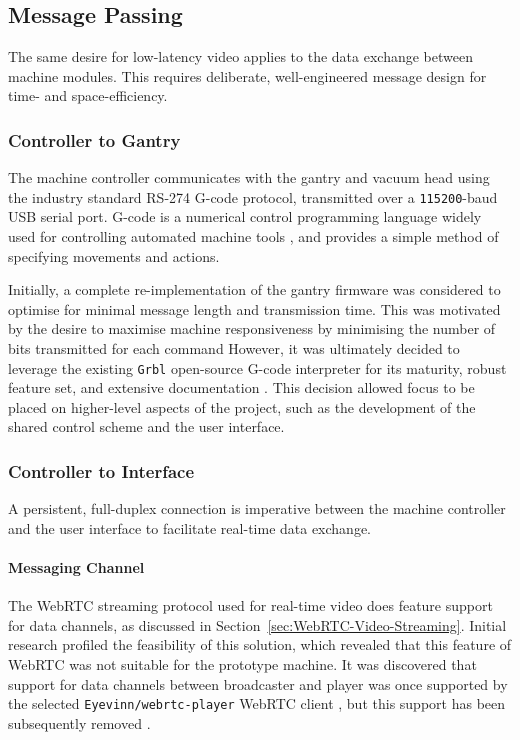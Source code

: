 \documentclass[12pt,british,UKenglish]{article}
\begin{document}

\subsection{Message Passing}

The same desire for low-latency video applies to the data exchange between machine modules.
This requires deliberate, well-engineered message design for time- and space-efficiency.

\subsubsection{Controller to Gantry}\label{sec:Controller-Interface-Messages}

The machine controller communicates with the gantry and vacuum head using the industry standard RS-274 G-code protocol, transmitted over a \texttt{115200}-baud USB serial port.
G-code is a numerical control programming language widely used for controlling automated machine tools \cite{02683768}, and provides a simple method of specifying movements and actions.

Initially, a complete re-implementation of the gantry firmware was considered to optimise for minimal message length and transmission time.
This was motivated by the desire to maximise machine responsiveness by minimising the number of bits transmitted for each command
However, it was ultimately decided to leverage the existing \texttt{Grbl} open-source G-code interpreter for its maturity, robust feature set, and extensive documentation \cite{grbl}.
This decision allowed focus to be placed on higher-level aspects of the project, such as the development of the shared control scheme and the user interface.


\subsubsection{Controller to Interface}\label{sec:Controller-Interface}

A persistent, full-duplex connection is imperative between the machine controller and the user interface to facilitate real-time data exchange.

\paragraph{Messaging Channel}
The \ac{WebRTC} streaming protocol used for real-time video does feature support for data channels, as discussed in Section~\ref{sec:WebRTC-Video-Streaming}.
Initial research profiled the feasibility of this solution, which revealed that this feature of \ac{WebRTC} was not suitable for the prototype machine.
It was discovered that support for data channels between broadcaster and player was once supported by the selected \texttt{Eyevinn/webrtc-player} \ac{WebRTC} client \cite{githubDatachannelSupport}, but this support has been subsequently removed \cite{githubFeatRemove}.
\end{document}
